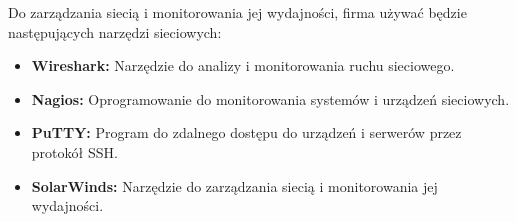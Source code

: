     Do zarządzania siecią i monitorowania jej wydajności, firma używać będzie następujących narzędzi sieciowych:

    \begin{itemize}
    \item \textbf{Wireshark:} Narzędzie do analizy i monitorowania ruchu sieciowego.
    \item \textbf{Nagios:} Oprogramowanie do monitorowania systemów i urządzeń sieciowych.
    \item \textbf{PuTTY:} Program do zdalnego dostępu do urządzeń i serwerów przez protokół SSH.
    \item \textbf{SolarWinds:} Narzędzie do zarządzania siecią i monitorowania jej wydajności.
    \end{itemize}
